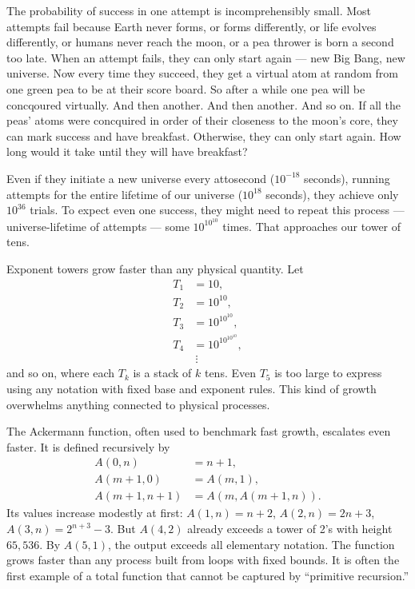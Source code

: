 The probability of success in one attempt is incomprehensibly small. Most attempts fail because Earth never forms, or forms differently, or life evolves differently, or humans never reach the moon, or a pea thrower is born a second too late. When an attempt fails, they can only start again — new Big Bang, new universe. Now every time they succeed, they get a virtual atom at random from one green pea to be at their score board. So after a while one pea will be concqoured virtually. And then another. And then another. And so on. If all the peas' atoms were concquired in order of their closeness to the moon's core, they can mark success and have breakfast. Otherwise, they can only start again. How long would it take until they will have breakfast?

Even if they initiate a new universe every attosecond ($10^{-18}$ seconds), running attempts for the entire lifetime of our universe ($10^{18}$ seconds), they achieve only $10^{36}$ trials. To expect even one success, they might need to repeat this process — universe-lifetime of attempts — some $10^{10^{10}}$ times. That approaches our tower of tens.

Exponent towers grow faster than any physical quantity. Let
\[
\begin{aligned}
T_1 &= 10, \\
T_2 &= 10^{10}, \\
T_3 &= 10^{10^{10}}, \\
T_4 &= 10^{10^{10^{10}}}, \\
&\ \vdots
\end{aligned}
\]
and so on, where each $T_k$ is a stack of $k$ tens. Even $T_5$ is too large to express using any notation with fixed base and exponent rules. This kind of growth overwhelms anything connected to physical processes.

The Ackermann function, often used to benchmark fast growth, escalates even faster. It is defined recursively by
\[
\begin{aligned}
A(0,n) &= n+1, \\
A(m+1,0) &= A(m,1), \\
A(m+1,n+1) &= A(m, A(m+1,n)).
\end{aligned}
\]
Its values increase modestly at first: $A(1,n) = n+2$, $A(2,n) = 2n+3$, $A(3,n) = 2^{n+3} - 3$. But $A(4,2)$ already exceeds a tower of 2’s with height $65,\!536$. By $A(5,1)$, the output exceeds all elementary notation. The function grows faster than any process built from loops with fixed bounds. It is often the first example of a total function that cannot be captured by “primitive recursion.”

